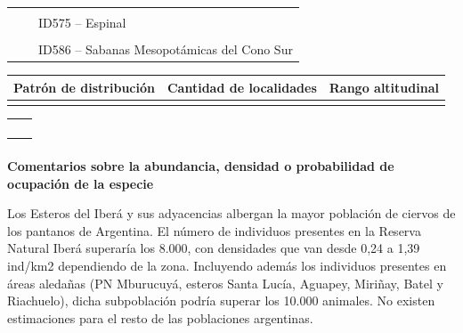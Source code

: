 \documentclass[
  x11names]{article}
\begin{document}
\begin{tabu} to 
\toprule
\textbf{} &  & \\
\textbf{} &  & ID575 – Espinal\\
\textbf{} &  & \\
\textbf{} &  & ID586 – Sabanas Mesopotámicas del Cono Sur\\
\bottomrule
\end{tabu}

\begin{tabu} to 
\toprule
\textbf{Patrón de distribución} & \textbf{Cantidad de localidades} & \textbf{Rango altitudinal}\\
\midrule
{} &  & \\
\bottomrule
\end{tabu}

\begin{tabu} to 
\toprule
\textbf{} & \\
\bottomrule
\end{tabu}

\begin{tabu} to 
\toprule
\textbf{} & \\
\bottomrule
\end{tabu}

\textbf{Comentarios sobre la abundancia, densidad o probabilidad de
ocupación de la especie}

Los Esteros del Iberá y sus adyacencias albergan la mayor población de
ciervos de los pantanos de Argentina. El número de individuos presentes
en la Reserva Natural Iberá superaría los 8.000, con densidades que van
desde 0,24 a 1,39 ind/km2 dependiendo de la zona. Incluyendo además los
individuos presentes en áreas aledañas (PN Mburucuyá, esteros Santa
Lucía, Aguapey, Miriñay, Batel y Riachuelo), dicha subpoblación podría
superar los 10.000 animales. No existen estimaciones para el resto de
las poblaciones argentinas.
\end{document}
